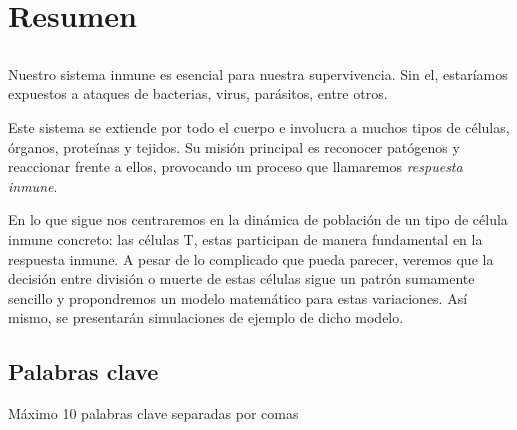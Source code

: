 \chapter*{Resumen}

\section*{\tituloPortadaVal}

Nuestro sistema inmune es esencial para nuestra supervivencia. Sin el, estaríamos expuestos a ataques de bacterias, virus, parásitos, entre otros. 

Este sistema se extiende por todo el cuerpo e involucra a muchos tipos de células, órganos, proteínas y tejidos. Su misión principal es reconocer patógenos y reaccionar frente a ellos, provocando un proceso que llamaremos \textit{respuesta inmune}. 

En lo que sigue nos centraremos en la dinámica de población de un tipo de célula inmune concreto: las células T, estas participan de manera fundamental en la respuesta inmune. A pesar de lo complicado que pueda parecer, veremos que la decisión entre división o muerte de estas células sigue un patrón sumamente sencillo y propondremos un modelo matemático para estas variaciones. Así mismo, se presentarán simulaciones de ejemplo de dicho modelo. 

\section*{Palabras clave}
   
\noindent Máximo 10 palabras clave separadas por comas

   


